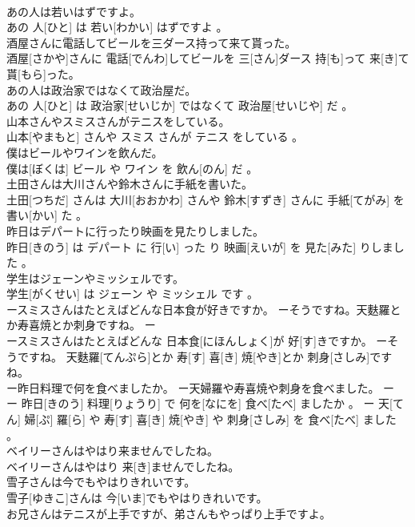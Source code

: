 \documentclass[8pt]{extreport}
\begin{document}
\begin{CJK}{UTF8}{min}
\\	あの人は若いはずですよ。	
\\	あの 人[ひと] は 若い[わかい] はずですよ 。
\\	酒屋さんに電話してビールを三ダース持って来て貰った。	
\\	酒屋[さかや]さんに 電話[でんわ]してビールを 三[さん]ダース 持[も]って 来[き]て 貰[もら]った。
\\	あの人は政治家ではなくて政治屋だ。	
\\	あの 人[ひと] は 政治家[せいじか] ではなくて 政治屋[せいじや] だ 。
\\	山本さんやスミスさんがテニスをしている。	
\\	山本[やまもと] さんや スミス さんが テニス をしている 。
\\	僕はビールやワインを飲んだ。	
\\	僕は[ぼくは] ビール や ワイン を 飲ん[のん] だ 。
\\	土田さんは大川さんや鈴木さんに手紙を書いた。	
\\	土田[つちだ] さんは 大川[おおかわ] さんや 鈴木[すずき] さんに 手紙[てがみ] を 書い[かい] た 。
\\	昨日はデパートに行ったり映画を見たりしました。	
\\	昨日[きのう] は デパート に 行[い] った り 映画[えいが] を 見た[みた] りしました 。
\\	学生はジェーンやミッシェルです。	
\\	学生[がくせい] は ジェーン や ミッシェル です 。
\\	ースミスさんはたとえばどんな日本食が好きですか。 ーそうですね。天麩羅とか寿喜焼とか刺身ですね。	ー
\\	ースミスさんはたとえばどんな 日本食[にほんしょく]が 好[す]きですか。 ーそうですね。 天麩羅[てんぷら]とか 寿[す] 喜[き] 焼[やき]とか 刺身[さしみ]ですね。
\\	ー昨日料理で何を食べましたか。 ー天婦羅や寿喜焼や刺身を食べました。	ー
\\	ー 昨日[きのう] 料理[りょうり] で 何を[なにを] 食べ[たべ] ましたか 。 ー 天[てん] 婦[ぷ] 羅[ら] や 寿[す] 喜[き] 焼[やき] や 刺身[さしみ] を 食べ[たべ] ました 。
\\	ベイリーさんはやはり来ませんでしたね。	
\\	ベイリーさんはやはり 来[き]ませんでしたね。
\\	雪子さんは今でもやはりきれいです。	
\\	雪子[ゆきこ]さんは 今[いま]でもやはりきれいです。
\\	お兄さんはテニスが上手ですが、弟さんもやっぱり上手ですよ。	

\end{CJK}
\end{document}
